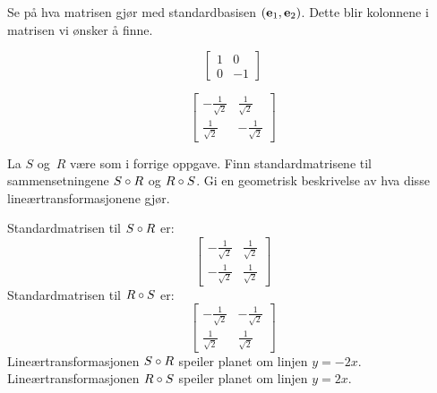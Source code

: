 \begin{losning}
Se på hva matrisen gjør med standardbasisen $(\mathbf{e}_1, \mathbf{e}_2)$. Dette blir
kolonnene i matrisen vi ønsker å finne.
\begin{punkt}
\[
\begin{bmatrix}
1 & 0\\
0 & -1
\end{bmatrix}
\]
\end{punkt}

\begin{punkt}
\[
\begin{bmatrix}
-\frac{1}{\sqrt{2}} & \frac{1}{\sqrt{2}} \\
\frac{1}{\sqrt{2}}  & -\frac{1}{\sqrt{2}} 
\end{bmatrix}
\]
\end{punkt}


\end{losning}


\begin{oppgave}
La $S$ og~$R$ være som i forrige oppgave.  Finn standardmatrisene til
sammensetningene $S \circ R$ og $R \circ S$.  Gi en geometrisk
beskrivelse av hva disse lineærtransformasjonene gjør.
\end{oppgave}

\begin{losning}
Standardmatrisen til $S \circ R$ er:
\[
\begin{bmatrix}
-\frac{1}{\sqrt{2}} & \frac{1}{\sqrt{2}} \\
-\frac{1}{\sqrt{2}}  & \frac{1}{\sqrt{2}} 
\end{bmatrix}
\]
Standardmatrisen til $R \circ S$ er:
\[
\begin{bmatrix}
-\frac{1}{\sqrt{2}} & -\frac{1}{\sqrt{2}} \\
\frac{1}{\sqrt{2}}  & \frac{1}{\sqrt{2}} 
\end{bmatrix}
\]
Lineærtransformasjonen $S \circ R$ speiler planet om linjen
$y = -2x$.
Lineærtransformasjonen $R \circ S$ speiler planet om linjen
$y = 2x$.
\end{losning}


